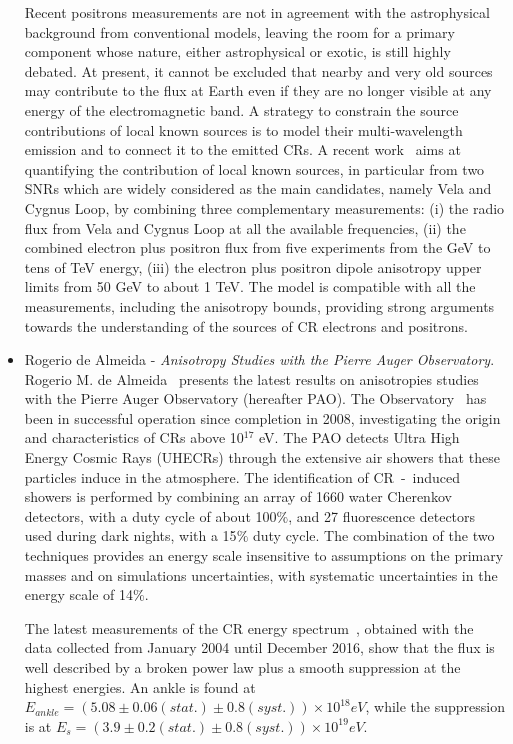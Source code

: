 \documentclass{PoS}
\begin{document}
\begin{itemize}
Recent positrons measurements are not in agreement with the astrophysical background from conventional models, leaving the room for a primary component whose nature, either astrophysical or exotic, is still highly debated. At present, it cannot be excluded that nearby and
very old sources may contribute to the flux at Earth even if they are no longer visible at any
energy of the electromagnetic band. A strategy to constrain the source contributions of local
known sources is to model their multi-wavelength emission and to connect it to the emitted
CRs. A recent work~\cite{Manconi:2018azw} aims at  quantifying the contribution of local known
sources, in particular from two SNRs which are widely considered as the main candidates, namely Vela and Cygnus Loop, by combining three complementary measurements: (i) the radio flux from Vela and Cygnus Loop at all the available frequencies, (ii) the combined electron plus positron flux from five experiments from the GeV to tens of TeV energy, (iii) the electron plus positron dipole anisotropy upper limits from 50 GeV to about 1 TeV. 
The model is compatible with all the measurements, including the anisotropy bounds, providing strong arguments towards the understanding of the sources of CR electrons and positrons. 







\item Rogerio de Almeida - {\it Anisotropy Studies with the Pierre Auger Observatory}. 
Rogerio M. de Almeida~\cite{Rogerio} presents the latest results on anisotropies studies with the Pierre Auger Observatory (hereafter PAO). 
The Observatory~\cite{PAOdet} has been in successful operation since completion in 2008,  investigating the origin and characteristics of CRs above 10$^{17}$ eV. The PAO detects Ultra High Energy Cosmic Rays (UHECRs) through the extensive air showers that these particles induce in the atmosphere. The identification of CR~-~induced showers is performed by combining an array of  1660  water Cherenkov detectors, with a duty cycle of about 100$\%$, and 27 fluorescence detectors used during dark nights, with a 15$\%$ duty cycle. The combination of the two techniques provides an energy scale insensitive to assumptions on the primary masses and on simulations uncertainties, with systematic uncertainties in the energy scale of 14$\%$.

The latest measurements of the CR energy spectrum~\cite{PAOICRC2017}, obtained with the data collected from January 2004 until December
2016, show that the flux is well described by a broken power law plus a smooth suppression
at the highest energies. An ankle is found at
$E_{ankle} = (5.08 \pm 0.06(stat.) \pm 0.8(syst.)) \times 10^{18} eV$, while the suppression is at $E_{s} = (3.9 \pm 0.2(stat.) \pm
0.8(syst.)) \times 10^{19} eV$. 


\end{itemize}
\end{document}
